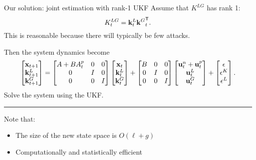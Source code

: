
\begin{frame}{Our solution: joint estimation with rank-1 UKF}
Assume that $K^{LG}$ has rank 1:
\begin{equation*}
K^{LG}_t=\mathbf{k}^L_t{\mathbf{k}^G}^{\mathsf{T}}_{t}.
\end{equation*}
This is reasonable because there will typically be few attacks.

Then the system dynamics become
\begin{equation*}
\begin{bmatrix}
\mathbf{x}_{t+1} \\
\mathbf{k}^L_{t+1} \\
\mathbf{k}^G_{t+1} \\
\end{bmatrix}
=
\begin{bmatrix}
A + BA^p_t & 0 & 0\\
0 & I & 0\\
0 & 0 & I
\end{bmatrix}
\begin{bmatrix}
\mathbf{x}_t \\
\mathbf{k}^L_{t} \\
\mathbf{k}^G_{t} \\
\end{bmatrix}
+
\begin{bmatrix}
B & 0 & 0\\
0 & I & 0\\
0 & 0 & I\\
\end{bmatrix}
\begin{bmatrix}
\mathbf{u}_t^n + \mathbf{u}_t^p \\
\mathbf{u}^L_t \\
\mathbf{u}^G_t
\end{bmatrix}
+
\begin{bmatrix}
\epsilon \\
\epsilon^K \\
\epsilon^L
\end{bmatrix}
.
\end{equation*}
Solve the system using the UKF.

\noindent\rule[0.5ex]{\linewidth}{1pt}
\pause

Note that:
\begin{itemize}
\item The size of the new state space is $O(\ell+g)$
\item Computationally and statistically efficient
\end{itemize}

\end{frame}
